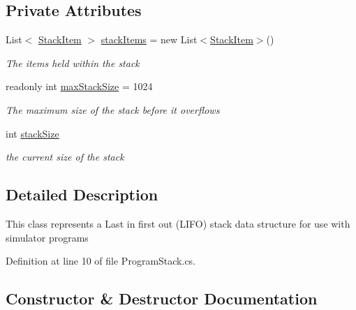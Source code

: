 \subsection*{Private Attributes}
\begin{DoxyCompactItemize}
\item 
List$<$ \hyperlink{class_c_p_u___o_s___simulator_1_1_c_p_u_1_1_stack_item}{Stack\+Item} $>$ \hyperlink{class_c_p_u___o_s___simulator_1_1_c_p_u_1_1_program_stack_ada087487ee69e4e38e2f2591bdc28f37}{stack\+Items} = new List$<$\hyperlink{class_c_p_u___o_s___simulator_1_1_c_p_u_1_1_stack_item}{Stack\+Item}$>$()
\begin{DoxyCompactList}\small\item\em The items held within the stack \end{DoxyCompactList}\item 
readonly int \hyperlink{class_c_p_u___o_s___simulator_1_1_c_p_u_1_1_program_stack_a2e475bb3c8ce48b8b0a86e31b2cb972e}{max\+Stack\+Size} = 1024
\begin{DoxyCompactList}\small\item\em The maximum size of the stack before it overflows \end{DoxyCompactList}\item 
int \hyperlink{class_c_p_u___o_s___simulator_1_1_c_p_u_1_1_program_stack_ab0667a30e4d6e10c3ffddfdfbc084102}{stack\+Size}
\begin{DoxyCompactList}\small\item\em the current size of the stack \end{DoxyCompactList}\end{DoxyCompactItemize}


\subsection{Detailed Description}
This class represents a Last in first out (L\+I\+F\+O) stack data structure for use with simulator programs 



Definition at line 10 of file Program\+Stack.\+cs.



\subsection{Constructor \& Destructor Documentation}
\hypertarget{class_c_p_u___o_s___simulator_1_1_c_p_u_1_1_program_stack_a2a30dfbb7df3408de94c883c44aff090}{}
